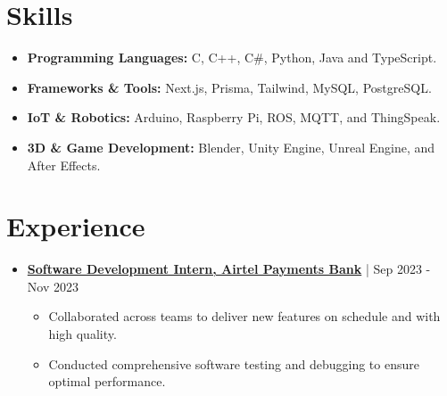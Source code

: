 \documentclass[a4paper,10pt]{article}
\newcommand{\sectionbreak}{\vspace{0.2em}} %
\newcommand{\subsectionbreak}{\vspace{0em}} %
\begin{document}
\section{Skills}
\begin{itemize}[noitemsep, topsep=0pt]
    \item \textbf{Programming Languages:} C, C++, C\#, Python, Java and TypeScript.
    \item \textbf{Frameworks \& Tools:} Next.js, Prisma, Tailwind, MySQL, PostgreSQL.
    \item \textbf{IoT \& Robotics:} Arduino, Raspberry Pi, ROS, MQTT, and ThingSpeak.
    \item \textbf{3D \& Game Development:} Blender, Unity Engine, Unreal Engine, and After Effects.
\end{itemize}
\sectionbreak

\section{Experience}
\begin{itemize}[noitemsep, topsep=0pt]
    \item \href{https://drive.google.com/file/d/1zCj8CKZbHcKEj6LS8N3VzG33aIENUIZA/view?usp=sharing}{\textcolor{accentcolor}{\textbf{
Software Development Intern, Airtel Payments Bank}}} | Sep 2023 - Nov 2023
        \subsectionbreak
        \begin{itemize}
            \item Collaborated across teams to deliver new features on schedule and with high quality.
            \item Conducted comprehensive software testing and debugging to ensure optimal performance.
        \end{itemize}
        \subsectionbreak
\end{itemize}

\sectionbreak

\end{document}

